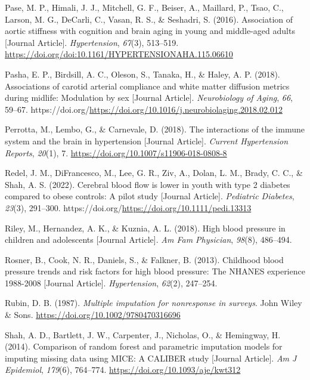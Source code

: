 \documentclass[
  letterpaper,
  DIV=11,
  numbers=noendperiod]{scrreport}
\newlength{\cslhangindent}
\newenvironment{CSLReferences}[2] %
 {\begin{list}{}{%
  \setlength{\itemindent}{0pt}
  \setlength{\leftmargin}{0pt}
  \setlength{\parsep}{0pt}
  \ifodd #1
   \setlength{\leftmargin}{\cslhangindent}
   \setlength{\itemindent}{-1\cslhangindent}
  \fi
  \setlength{\itemsep}{#2\baselineskip}}}
 {\end{list}}
\begin{document}
\begin{CSLReferences}{1}{0}
Pase, M. P., Himali, J. J., Mitchell, G. F., Beiser, A., Maillard, P.,
Tsao, C., Larson, M. G., DeCarli, C., Vasan, R. S., \& Seshadri, S.
(2016). Association of aortic stiffness with cognition and brain aging
in young and middle-aged adults {[}Journal Article{]}.
\emph{Hypertension}, \emph{67}(3), 513--519.
\url{https://doi.org/doi:10.1161/HYPERTENSIONAHA.115.06610}

Pasha, E. P., Birdsill, A. C., Oleson, S., Tanaka, H., \& Haley, A. P.
(2018). Associations of carotid arterial compliance and white matter
diffusion metrics during midlife: Modulation by sex {[}Journal
Article{]}. \emph{Neurobiology of Aging}, \emph{66}, 59--67.
https://doi.org/\url{https://doi.org/10.1016/j.neurobiolaging.2018.02.012}

Perrotta, M., Lembo, G., \& Carnevale, D. (2018). The interactions of
the immune system and the brain in hypertension {[}Journal Article{]}.
\emph{Current Hypertension Reports}, \emph{20}(1), 7.
\url{https://doi.org/10.1007/s11906-018-0808-8}

Redel, J. M., DiFrancesco, M., Lee, G. R., Ziv, A., Dolan, L. M., Brady,
C. C., \& Shah, A. S. (2022). Cerebral blood flow is lower in youth with
type 2 diabetes compared to obese controls: A pilot study {[}Journal
Article{]}. \emph{Pediatric Diabetes}, \emph{23}(3), 291--300.
https://doi.org/\url{https://doi.org/10.1111/pedi.13313}

Riley, M., Hernandez, A. K., \& Kuznia, A. L. (2018). High blood
pressure in children and adolescents {[}Journal Article{]}. \emph{Am Fam
Physician}, \emph{98}(8), 486--494.

Rosner, B., Cook, N. R., Daniels, S., \& Falkner, B. (2013). Childhood
blood pressure trends and risk factors for high blood pressure: The
NHANES experience 1988-2008 {[}Journal Article{]}. \emph{Hypertension},
\emph{62}(2), 247--254.

Rubin, D. B. (1987). \emph{Multiple imputation for nonresponse in
surveys}. John Wiley \& Sons.
\url{https://doi.org/10.1002/9780470316696}

Shah, A. D., Bartlett, J. W., Carpenter, J., Nicholas, O., \& Hemingway,
H. (2014). Comparison of random forest and parametric imputation models
for imputing missing data using MICE: A CALIBER study {[}Journal
Article{]}. \emph{Am J Epidemiol}, \emph{179}(6), 764--774.
\url{https://doi.org/10.1093/aje/kwt312}


\end{CSLReferences}
\end{document}
